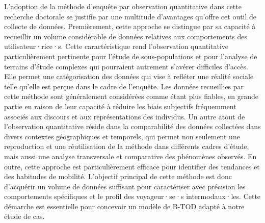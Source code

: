\begin{refsegment}
L'adoption de la méthode d'enquête par observation quantitative dans cette recherche doctorale se justifie par une multitude d'avantages qu'offre cet outil de collecte de données. Premièrement, cette approche se distingue par sa capacité à recueillir un volume considérable de données relatives aux comportements des utilisateur·rice·s. Cette caractéristique rend l'observation quantitative particulièrement pertinente pour l'étude de sous-populations et pour l'analyse de terrains d'étude complexes qui pourraient autrement s'avérer difficiles d'accès. Elle permet une catégorisation des données qui vise à refléter une réalité sociale telle qu'elle est perçue dans le cadre de l'enquête. Les données recueillies par cette méthode sont généralement considérées comme étant plus fiables, en grande partie en raison de leur capacité à réduire les biais subjectifs fréquemment associés aux discours et aux représentations des individus. Un autre atout de l'observation quantitative réside dans la comparabilité des données collectées dans divers contextes géographiques et temporels, qui permet non seulement une reproduction et une réutilisation de la méthode dans différents cadres d'étude, mais aussi une analyse transversale et comparative des phénomènes observés. En outre, cette approche est particulièrement efficace pour identifier des tendances et des habitudes de mobilité. L'objectif principal de cette méthode est donc d'acquérir un volume de données suffisant pour caractériser avec précision les comportements spécifiques et le profil des voyageur·se·s intermodaux·les. Cette démarche est essentielle pour concevoir un modèle de \acrfull{B-TOD} adapté à notre étude de cas.%


\end{refsegment}
